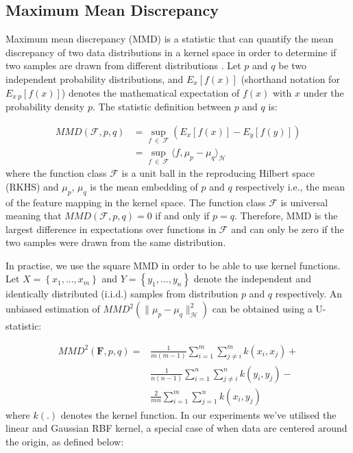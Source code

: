 \documentclass{mpaper}
\begin{document}
\subsection{Maximum Mean Discrepancy}\label{chap2:MMD}

Maximum mean discrepancy (MMD) is a statistic that can quantify the mean discrepancy of two data distributions in a kernel space in order to determine if two samples are drawn from different distributions \cite{OriginalMMD}. Let $p$ and $q$ be two independent probability distributions, and $E_x\left[f\left(x\right)\right]$ (shorthand notation for $E_{x~p}\left[f\left(x\right)\right]$) denotes the mathematical expectation of $f\left(x\right)$ with $x$ under the probability density $p$. The statistic definition between $p$ and $q$ is:

\begin{equation}
\begin{aligned}
    	MMD\left( \boldsymbol{\mathcal{F}},p, q \right) & = \sup_{f\ \in\ \boldsymbol{\mathcal{F}}} {\left( E_x \left[ f\left( x \right) \right] -E_y \left[ f \left( y \right) \right] \right)} \\
    	& = {\sup_{f\ \in\ \boldsymbol{\mathcal{F}}}{\langle f,\mu_p-\mu_q\rangle_{\boldsymbol{\mathcal{H}}}}}
\end{aligned}
\end{equation}
where the function class $\boldsymbol{\mathcal{F}}$ is a unit ball in the reproducing Hilbert space (RKHS) and $\mu_p$, $\mu_q$ is the mean embedding of $p$ and $q$ respectively i.e., the mean of the feature mapping in the kernel space. The function class $\boldsymbol{\mathcal{F}}$ is universal meaning that $MMD\left(\boldsymbol{\mathcal{F}},p,q\right)=0$ if and only if $p=q$. Therefore, MMD is the largest difference in expectations over functions in $\boldsymbol{\mathcal{F}}$ and can only be zero if the two samples were drawn from the same distribution.

In practise, we use the square MMD in order to be able to use kernel functions. Let $X=\left\{x_1,...,x_m\right\}$ and $Y=\left\{y_1,...,y_n\right\}$ denote the independent and identically distributed (i.i.d.) samples from distribution $p$ and $q$ respectively. An unbiased estimation of $MMD^2 \left( \parallel{\mu_p-\mu_q}\parallel^2_{\boldsymbol{\mathcal{H}}} \right)$ can be obtained using a U-statistic:

\begin{equation}
\begin{aligned}
	MMD^2\left(\mathbf{F},p,q\right) = &\frac{1}{m(m-1)}\sum_{i=1}^{m}\sum_{j\neq i}^{m}k\left(x_i,x_j\right) + \\
	& \frac{1}{n(n-1)}\sum_{i=1}^{n}\sum_{j\neq i}^{n}k\left(y_i,y_j\right) - \\
	& \frac{2}{mn}\sum_{i=1}^{m}\sum_{j=1}^{n}k\left(x_i,y_j\right) 
\end{aligned}
\end{equation}
where $k(.)$ denotes the kernel function. In our experiments we've utilised the linear and Gaussian RBF kernel, a special case of when data are centered around the origin, as defined below:
\end{document}
